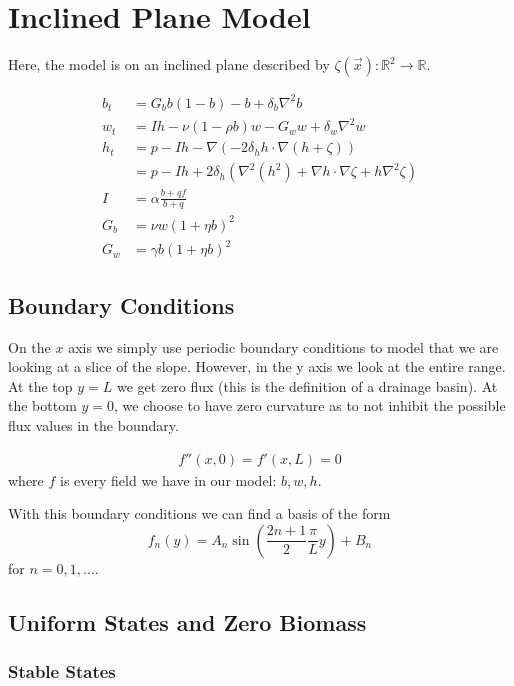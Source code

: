 \section{Inclined Plane Model}

Here, the model is on an inclined plane described by $\zeta\left(\vec{x}\right): \mathbb{R}^2 \rightarrow \mathbb{R}$.

\begin{align*}
b_{t} & =G_{b}b\left(1-b\right)-b+\delta_{b}\nabla^{2}b\\
w_{t} & =Ih-\nu (1-\rho b) w-G_{w}w+\delta_{w}\nabla^{2}w\\
h_{t} & =p-Ih-\nabla\left(-2\delta_{h}h\cdot\nabla\left(h+\zeta\right)\right)\\
 &= p - Ih +2 \delta_h \left( \nabla^2 (h^2) + \nabla h \cdot \nabla \zeta + h\nabla^2 \zeta \right) \\
I & =\alpha\frac{b+qf}{b+q}\\
G_{b} & =\nu w\left(1+\eta b\right)^{2}\\
G_{w} & =\gamma b\left(1+\eta b\right)^{2}
\end{align*}

\subsection{Boundary Conditions}
On the $x$ axis we simply use periodic boundary conditions to model that we are looking at a slice of the slope. However, in the y axis we look at the entire range. At the top $y=L$ we get zero flux (this is the definition of a drainage basin). At the bottom $y=0$, we choose to have zero curvature as to not inhibit the possible flux values in the boundary.

\begin{align*}
    f''\left(x,0\right) = f'(x,L)=0
\end{align*}
where $f$ is every field we have in our model: $b,w,h$.

With this boundary conditions we can find a basis of the form
\[
f_n(y) = A_n \sin\left(\frac{2n+1}{2}\frac{\pi}{L}y\right)+ B_n
\]
for $n=0,1,...$.

\subsection{Uniform States and Zero Biomass}

\subsubsection{Stable States}

